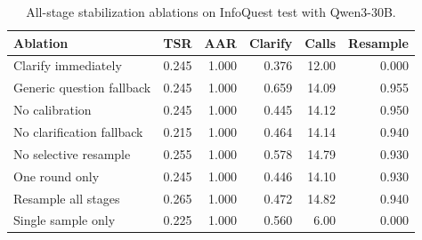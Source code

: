\begin{table}[t]
\centering
\caption{All-stage stabilization ablations on InfoQuest test with Qwen3-30B.}
\label{tab:ablations}
\begin{tabular}{lrrrrr}
\toprule
Ablation & TSR & AAR & Clarify & Calls & Resample \\
\midrule
Clarify immediately & 0.245 & 1.000 & 0.376 & 12.00 & 0.000 \\
Generic question fallback & 0.245 & 1.000 & 0.659 & 14.09 & 0.955 \\
No calibration & 0.245 & 1.000 & 0.445 & 14.12 & 0.950 \\
No clarification fallback & 0.215 & 1.000 & 0.464 & 14.14 & 0.940 \\
No selective resample & 0.255 & 1.000 & 0.578 & 14.79 & 0.930 \\
One round only & 0.245 & 1.000 & 0.446 & 14.10 & 0.930 \\
Resample all stages & 0.265 & 1.000 & 0.472 & 14.82 & 0.940 \\
Single sample only & 0.225 & 1.000 & 0.560 & 6.00 & 0.000 \\
\bottomrule
\end{tabular}
\end{table}
